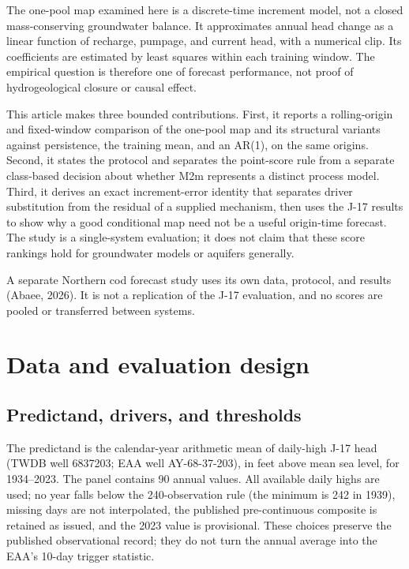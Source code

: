 \documentclass[11pt]{article}
\begin{document}
The one-pool map examined here is a discrete-time increment model, not a closed mass-conserving groundwater balance. It approximates annual head change as a linear function of recharge, pumpage, and current head, with a numerical clip. Its coefficients are estimated by least squares within each training window. The empirical question is therefore one of forecast performance, not proof of hydrogeological closure or causal effect.

This article makes three bounded contributions. First, it reports a rolling-origin and fixed-window comparison of the one-pool map and its structural variants against persistence, the training mean, and an AR(1), on the same origins. Second, it states the protocol and separates the point-score rule from a separate class-based decision about whether M2m represents a distinct process model. Third, it derives an exact increment-error identity that separates driver substitution from the residual of a supplied mechanism, then uses the J-17 results to show why a good conditional map need not be a useful origin-time forecast. The study is a single-system evaluation; it does not claim that these score rankings hold for groundwater models or aquifers generally.

A separate Northern cod forecast study uses its own data, protocol, and results (Abaee, 2026). It is not a replication of the J-17 evaluation, and no scores are pooled or transferred between systems.

\section{Data and evaluation design}

\subsection{Predictand, drivers, and thresholds}

The predictand is the calendar-year arithmetic mean of daily-high J-17 head (TWDB well 6837203; EAA well AY-68-37-203), in feet above mean sea level, for 1934--2023. The panel contains 90 annual values. All available daily highs are used; no year falls below the 240-observation rule (the minimum is 242 in 1939), missing days are not interpolated, the published pre-continuous composite is retained as issued, and the 2023 value is provisional. These choices preserve the published observational record; they do not turn the annual average into the EAA's 10-day trigger statistic.
\end{document}
